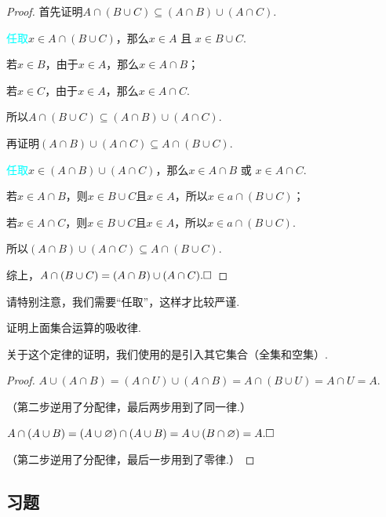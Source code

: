 \documentclass[lang=cn,math=cm,chinesefont=nofont,11pt,scheme=chinese,twocol]{elegantbook}
\begin{document}
\begin{proof}
  首先证明$A\cap(B\cup C)\subseteq(A\cap B)\cup(A\cap C)$.

  \textcolor{cyan}{任取}\enspace$x\in A\cap(B\cup C)$，那么$x\in A\text{ 且 }x\in B\cup C$.

  若$x\in B$，由于$x\in A$，那么$x\in A\cap B$；

  若$x\in C$，由于$x\in A$，那么$x\in A\cap C$.

  所以$A\cap(B\cup C)\subseteq(A\cap B)\cup(A\cap C)$.

  \hspace*{\fill}

  再证明$(A\cap B)\cup(A\cap C)\subseteq A\cap(B\cup C)$.

  \textcolor{cyan}{任取}\enspace$x\in (A\cap B)\cup(A\cap C)$，那么$x\in A\cap B\text{ 或 }x\in A\cap C$.

  若$x\in A\cap B$，则$x\in B\cup C\text{且}x\in A$，所以$x\in a\cap(B\cup C)$；

  若$x\in A\cap C$，则$x\in B\cup C\text{且}x\in A$，所以$x\in a\cap(B\cup C)$.

  所以$(A\cap B)\cup(A\cap C)\subseteq A\cap(B\cup C)$.

  综上，$A\cap(B\cup C)=(A\cap B)\cup(A\cap C).\hfill\square$
\end{proof}
\begin{remark}
  请特别注意，我们需要“任取”，这样才比较严谨.
\end{remark}

\hspace*{\fill}

\begin{example}
  证明上面集合运算的吸收律.
\end{example}
关于这个定律的证明，我们使用的是引入其它集合（全集和空集）.

\begin{proof}
  $A\cup (A\cap B)=(A\cap U)\cup(A\cap B)=A\cap(B\cup U)=A\cap U=A.$

  （第二步逆用了分配律，最后两步用到了同一律.）

  $A\cap(A\cup B)=(A\cup\varnothing)\cap(A\cup B)=A\cup(B\cap\varnothing)=A.\hfill\square$

  （第二步逆用了分配律，最后一步用到了零律.）
\end{proof}

\subsection{习题}
\end{document}
